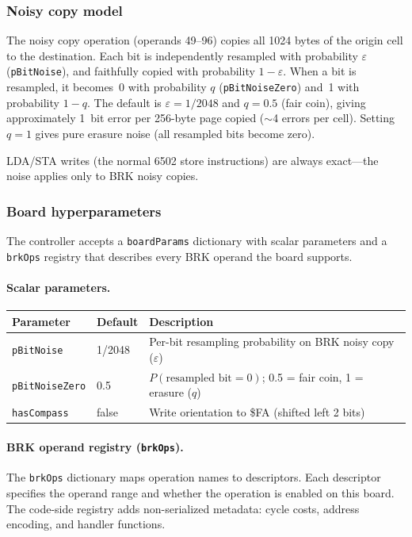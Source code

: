 \documentclass{article}
\begin{document}
\begin{itemize}
\begin{itemize}
      \subsubsection*{Noisy copy model}

      The noisy copy operation (operands 49--96) copies all 1024 bytes of the
      origin cell to the destination. Each bit is independently resampled
      with probability $\varepsilon$ (\texttt{pBitNoise}), and faithfully
      copied with probability $1-\varepsilon$. When a bit is resampled,
      it becomes~0 with probability $q$ (\texttt{pBitNoiseZero}) and~1 with
      probability $1-q$. The default is $\varepsilon = 1/2048$ and $q = 0.5$
      (fair coin), giving approximately 1~bit error per 256-byte page copied
      ($\sim$4 errors per cell). Setting $q=1$ gives pure erasure noise
      (all resampled bits become zero).

      LDA/STA writes (the normal 6502 store instructions) are always exact---the
      noise applies only to BRK noisy copies.

      \subsubsection*{Board hyperparameters}

      The controller accepts a \texttt{boardParams} dictionary with scalar
      parameters and a \texttt{brkOps} registry that describes every BRK
      operand the board supports.

      \paragraph{Scalar parameters.}

      \begin{tabular}{l|l|p{}}
        Parameter & Default & Description \\ \hline
        \texttt{pBitNoise} & 1/2048 & Per-bit resampling probability on BRK noisy copy ($\varepsilon$) \\
        \texttt{pBitNoiseZero} & 0.5 & $P(\text{resampled bit} = 0)$; 0.5 = fair coin, 1 = erasure ($q$) \\
        \texttt{hasCompass} & false & Write orientation to \$FA (shifted left 2 bits)
      \end{tabular}

      \paragraph{BRK operand registry (\texttt{brkOps}).}
      The \texttt{brkOps} dictionary maps operation names to descriptors.
      Each descriptor specifies the operand range and whether the operation
      is enabled on this board.  The code-side registry adds non-serialized
      metadata: cycle costs, address encoding, and handler functions.


\end{itemize}
\end{itemize}
\end{document}

